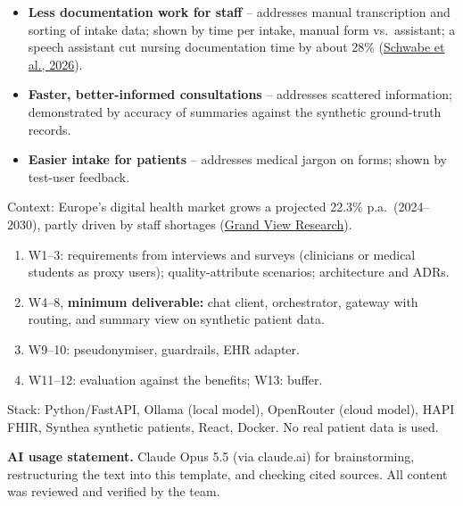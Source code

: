 \documentclass[11pt,a4paper]{article}
\newcommand{\pibapart}[1]{\vspace{0.4em}{\large\textbf{#1}}\par}
\begin{document}
\pibapart{Benefits}
\begin{itemize}
  \item \textbf{Less documentation work for staff} -- addresses manual
        transcription and sorting of intake data; shown by time per
        intake, manual form vs.\ assistant; a speech assistant cut nursing documentation time by about 28\%
        (\href{https://doi.org/10.2196/86078}{Schwabe et al., 2026}).
  \item \textbf{Faster, better-informed consultations} -- addresses scattered
        information; demonstrated by accuracy of
        summaries against the synthetic ground-truth records.
  \item \textbf{Easier intake for patients} -- addresses medical jargon on
        forms; shown by test-user feedback.
\end{itemize}
Context: Europe's digital health market grows a projected 22.3\% p.a.\ (2024--2030), partly driven by staff shortages (\href{https://www.grandviewresearch.com/industry-analysis/europe-digital-health-market-report}{Grand View Research}).

\pibapart{Action}
\begin{enumerate}
  \item W1--3: requirements from interviews and surveys (clinicians or medical
        students as proxy users); quality-attribute scenarios; architecture and ADRs.
  \item W4--8, \textbf{minimum deliverable:} chat client, orchestrator, gateway
        with routing, and summary view on synthetic patient data.
  \item W9--10: pseudonymiser, guardrails, EHR adapter.
  \item W11--12: evaluation against the benefits; W13: buffer.
\end{enumerate}
Stack: Python/FastAPI, Ollama (local model), OpenRouter (cloud model), HAPI
FHIR, Synthea synthetic patients, React, Docker. No real patient data is used.

\vfill
{\small\textbf{AI usage statement.} Claude Opus 5.5 (via claude.ai) for
brainstorming, restructuring the text into this template, and checking cited
sources. All content was reviewed and verified by the team.}
\end{document}
